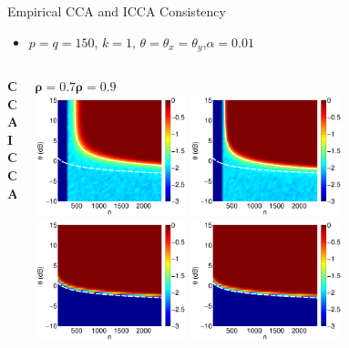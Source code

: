 \documentclass[8pt]{beamer}
\begin{document}
\begin{frame}{Empirical CCA and ICCA Consistency}
  \begin{itemize}
  \item $p=q=150$, $k=1$, $\theta = \theta_x=\theta_y$,$\alpha=0.01$
  \end{itemize}

  \begin{columns}[T]
  \begin{column}{0.01\textwidth}
    \vspace{15ex}
    \textbf{ CCA}\\
    \vspace{20ex}
    \textbf{ICCA}
  \end{column}
  \begin{column}{1\textwidth}
    \begin{center}
      $\boldsymbol{\rho=}\mathbf{0.7}$\hspace{23ex}$\boldsymbol{\rho=0.9}$\\[0.5ex]

        \includegraphics[width=0.35\textwidth]{figures/cca_rho7.pdf}\hspace{2ex}
        \includegraphics[width=0.35\textwidth]{figures/cca_rho9.pdf}\\[2ex]
        \includegraphics[width=0.35\textwidth]{figures/icca_rho7.pdf}\hspace{2ex}
        \includegraphics[width=0.35\textwidth]{figures/icca_rho9.pdf}
    \end{center}


\end{column}
\end{columns}
\end{frame}
\end{document}
